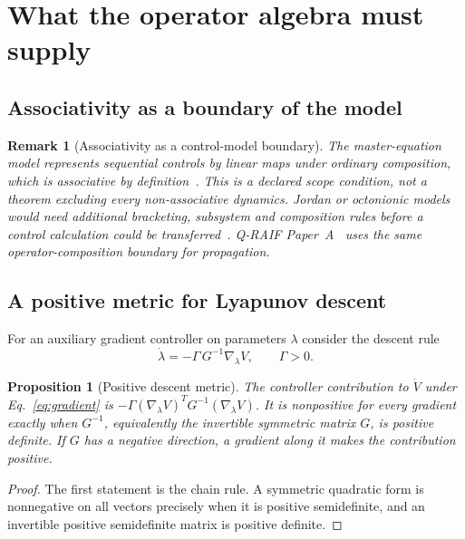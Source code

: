 \documentclass[aps,pre,onecolumn,superscriptaddress,floatfix,longbibliography]{revtex4-2}
\newtheorem{proposition}[theorem]{Proposition}
\newtheorem{remark}[theorem]{Remark}
\begin{document}
\section{What the operator algebra must supply}
\label{sec:algebra}

\subsection{Associativity as a boundary of the model}
\label{sec:assoc}

\begin{remark}[Associativity as a control-model boundary]
\label{rem:assoc-boundary}
The master-equation model represents sequential controls by linear maps under ordinary composition, which is associative by definition~\cite{Breuer2002}. This is a declared scope condition, not a theorem excluding every non-associative dynamics. Jordan or octonionic models would need additional bracketing, subsystem and composition rules before a control calculation could be transferred~\cite{Schafer1966,Gunaydin1973}. Q-RAIF Paper~A~\cite{Liu2026QRAIF_A} uses the same operator-composition boundary for propagation.
\end{remark}

\subsection{A positive metric for Lyapunov descent}
\label{sec:metric}

For an auxiliary gradient controller on parameters $\lambda$ consider the descent rule
\begin{equation}
\dot{\lambda} = -\Gamma\, G^{-1} \nabla_\lambda V,\qquad \Gamma>0.
\label{eq:gradient}
\end{equation}

\begin{proposition}[Positive descent metric]
\label{prop:descent}
The controller contribution to $\dot V$ under Eq.~\eqref{eq:gradient} is $-\Gamma(\nabla_\lambda V)^TG^{-1}(\nabla_\lambda V)$. It is nonpositive for every gradient exactly when $G^{-1}$, equivalently the invertible symmetric matrix $G$, is positive definite. If $G$ has a negative direction, a gradient along it makes the contribution positive.
\end{proposition}

\begin{proof}
The first statement is the chain rule. A symmetric quadratic form is nonnegative on all vectors precisely when it is positive semidefinite, and an invertible positive semidefinite matrix is positive definite.
\end{proof}
\end{document}
